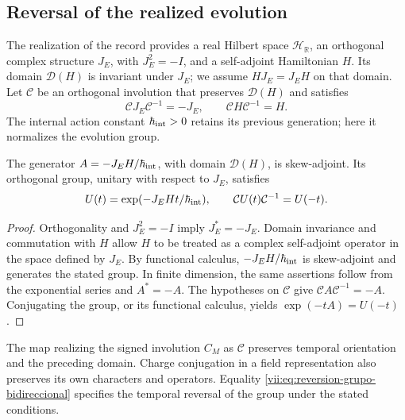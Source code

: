 \subsection{Reversal of the realized evolution}
\label{vii:subsec:reversion-evolucion}

The realization of the record provides a real Hilbert space
\(\mathcal H_{\mathbb R}\), an orthogonal complex structure
\(J_E\), with \(J_E^2=-I\), and a self-adjoint Hamiltonian \(H\).
Its domain \(\mathcal D(H)\) is invariant under \(J_E\); we assume
\(HJ_E=J_EH\) on that domain. Let \(\mathcal C\) be an orthogonal
involution that preserves \(\mathcal D(H)\) and satisfies
\begin{equation}
 \mathcal C J_E\mathcal C^{-1}=-J_E,\qquad
 \mathcal C H\mathcal C^{-1}=H.
 \label{vii:eq:dominio-reversion-evolucion}
\end{equation}
The internal action constant \(\hbar_{\rm int}>0\) retains its
previous generation; here it normalizes the evolution group.

\begin{theorem}
\label{vii:thm:reversion-evolucion}
The generator \(A=-J_EH/\hbar_{\rm int}\), with domain \(\mathcal D(H)\),
is skew-adjoint. Its orthogonal group, unitary with respect to \(J_E\), satisfies
\begin{equation}
 U(t)=\exp(-J_EHt/\hbar_{\rm int}),\qquad
 \mathcal C U(t)\mathcal C^{-1}=U(-t).
 \label{vii:eq:reversion-grupo-bidireccional}
\end{equation}
\end{theorem}
\begin{proof}
Orthogonality and \(J_E^2=-I\) imply \(J_E^*=-J_E\).
Domain invariance and commutation with \(H\) allow
\(H\) to be treated as a complex self-adjoint operator in the space defined by
\(J_E\). By functional calculus, \(-J_EH/\hbar_{\rm int}\) is
skew-adjoint and generates the stated group. In finite dimension, the same
assertions follow from the exponential series and \(A^*=-A\).
The hypotheses on \(\mathcal C\) give
\(\mathcal C A\mathcal C^{-1}=-A\). Conjugating the group, or its
functional calculus, yields \(\exp(-tA)=U(-t)\).
\end{proof}

The map realizing the signed involution \(C_M\) as \(\mathcal C\)
preserves temporal orientation and the preceding domain. Charge conjugation
in a field representation also preserves its own characters and operators.
Equality \eqref{vii:eq:reversion-grupo-bidireccional} specifies the temporal
reversal of the group under the stated conditions.

